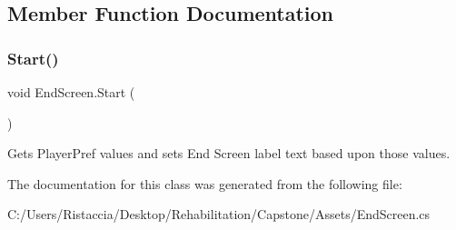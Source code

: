 \subsection{Member Function Documentation}
\mbox{\label{class_end_screen_a94abdfce9b0c1b1fd7775b62cee4fa47}} 
\subsubsection{\texorpdfstring{Start()}{Start()}}
{\footnotesize\ttfamily void End\+Screen.\+Start (\begin{DoxyParamCaption}{ }\end{DoxyParamCaption})\hspace{0.3cm}{\ttfamily [private]}}

Gets Player\+Pref values and sets End Screen label text based upon those values. 

The documentation for this class was generated from the following file\+:\begin{DoxyCompactItemize}
\item 
C\+:/\+Users/\+Ristaccia/\+Desktop/\+Rehabilitation/\+Capstone/\+Assets/End\+Screen.\+cs\end{DoxyCompactItemize}
